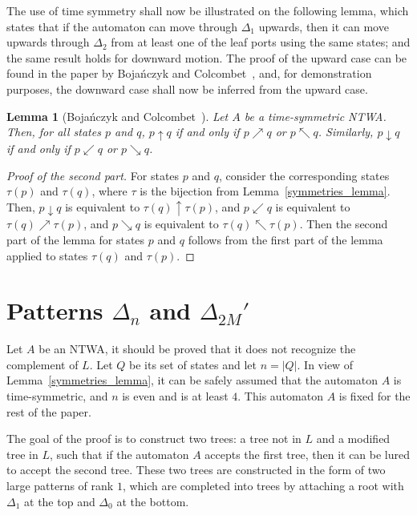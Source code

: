 \documentclass[12pt,a4paper]{article}
\newtheorem{lemma}{Lemma}
\theoremstyle{definition}
\begin{document}
The use of time symmetry shall now be illustrated
on the following lemma, which states that
if the automaton can move through $\Delta_1$ upwards,
then it can move upwards through $\Delta_2$ from at least one of the leaf ports using the same states;
and the same result holds for downward motion.
The proof of the upward case can be found
in the paper by Boja\'nczyk and Colcombet~\cite{BojanczykColcombet_reg},
and, for demonstration purposes, the downward case shall now be inferred from the upward case.

\begin{lemma}[Boja\'nczyk and Colcombet~{\cite[Prop.~5.6]{BojanczykColcombet_reg}}]
\label{lemma_delta1_up_and_down}
Let $A$ be a time-symmetric NTWA.
Then, for all states $p$ and $q$, $p \uparrow q$ if and only if $p \nearrow q$ or $p \nwarrow q$.
Similarly, $p \downarrow q$ if and only if $p \swarrow q$ or $p \searrow q$.
\end{lemma}
\begin{proof}[Proof of the second part]
For states $p$ and $q$, consider the corresponding states $\tau(p)$ and $\tau(q)$,
where $\tau$ is the bijection from Lemma~\ref{symmetries_lemma}.
Then, $p \downarrow q$ is equivalent to $\tau(q) \uparrow \tau(p)$,
and $p \swarrow q$ is equivalent to $\tau(q) \nearrow \tau(p)$,
and $p \searrow q$ is equivalent to $\tau(q) \nwarrow \tau(p)$. 
Then the second part of the lemma for states $p$ and $q$
follows from the first part of the lemma applied to states $\tau(q)$ and $\tau(p)$.
\end{proof}








\section{Patterns $\Delta_n$ and $\Delta_{2M}'$}\label{section_elements_with_and_without_errors}

Let $A$ be an NTWA, it should be proved that it does not recognize the complement of $L$.
Let $Q$ be its set of states and let $n=|Q|$.
In view of Lemma~\ref{symmetries_lemma},
it can be safely assumed that the automaton $A$
is time-symmetric, and $n$ is even and is at least $4$.
This automaton $A$ is fixed for the rest of the paper.

The goal of the proof is to construct two trees:
a tree not in $L$ and a modified tree in $L$, such that if the automaton $A$ accepts
the first tree, then it can be lured to accept the second tree.
These two trees are constructed in the form of two large patterns of rank $1$,
which are completed into trees by attaching a root with $\Delta_1$ at the top
and $\Delta_0$ at the bottom.
\end{document}
